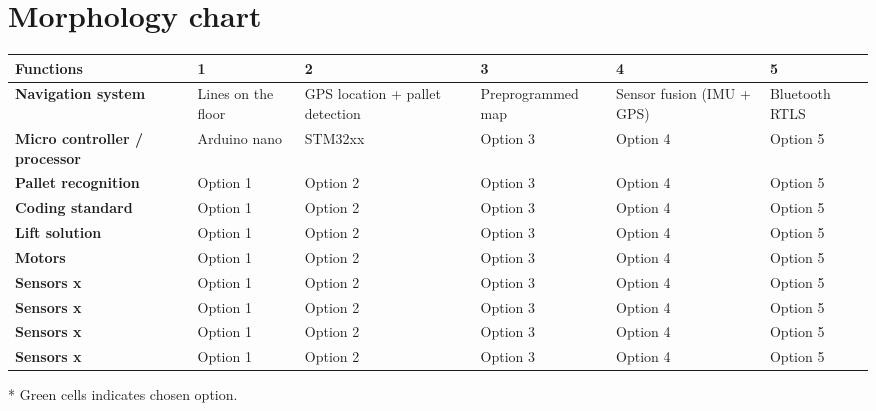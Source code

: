 \documentclass[landscape]{article}
\begin{document}
\section{Morphology chart}
\begin{table}[H]
    \begin{center}
        \begin{tabularx}{\linewidth}{L|L|L|L|L|L}
            \textbf{Functions} & \textbf{1} & \textbf{2}& \textbf{3} & 
            \textbf{4} & \textbf{5} \\
            \hline
            \textbf{Navigation system} & Lines on the floor & GPS location + pallet detection & Preprogrammed map  & Sensor fusion (IMU + GPS) & 
            Bluetooth RTLS \\
            \hline
            \textbf{Micro controller / processor} & Arduino nano & STM32xx & Option 3 & Option 4 & 
            Option 5 \\
            \hline
            \textbf{Pallet recognition} & Option 1 & Option 2 & Option 3 & Option 4 & 
            Option 5 \\
            \hline
            \textbf{Coding standard} & Option 1 & Option 2 & Option 3 & Option 4 & 
            Option 5 \\
            \hline
            \textbf{Lift solution} &  Option 1 & Option 2 & Option 3 & Option 4 & 
            Option 5 \\
            \hline
            \textbf{Motors} & Option 1 & Option 2 & Option 3 & Option 4 & 
            Option 5 \\
            \hline
            \textbf{Sensors x} & Option 1 & Option 2 & Option 3 & Option 4 & 
            Option 5 \\
            \hline
            \textbf{Sensors x} & Option 1 & Option 2 & Option 3 & Option 4 & 
            Option 5 \\
            \hline
            \textbf{Sensors x} & Option 1 & Option 2 & Option 3 & Option 4 & 
            Option 5 \\
            \hline
            \textbf{Sensors x} & Option 1 & Option 2 & Option 3 & Option 4 & 
            Option 5 \\
            \hline
        \end{tabularx}
    \end{center}
\end{table}
* Green cells indicates chosen option.
\end{document}
